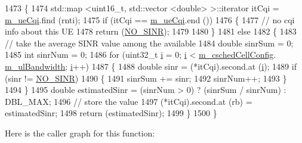 \begin{DoxyCode}
1473 \{
1474   std::map <uint16\_t, std::vector <double> >::iterator itCqi = \hyperlink{classns3_1_1PfFfMacScheduler_acf67c0074356c705e8bd89bb49ddd5ad}{m\_ueCqi}.find (rnti);
1475   \textcolor{keywordflow}{if} (itCqi == \hyperlink{classns3_1_1PfFfMacScheduler_acf67c0074356c705e8bd89bb49ddd5ad}{m\_ueCqi}.end ())
1476     \{
1477       \textcolor{comment}{// no cqi info about this UE}
1478       \textcolor{keywordflow}{return} (\hyperlink{cqa-ff-mac-scheduler_8h_a520d71777be043568160c783a9c65fd5}{NO\_SINR});
1479 
1480     \}
1481   \textcolor{keywordflow}{else}
1482     \{
1483       \textcolor{comment}{// take the average SINR value among the available}
1484       \textcolor{keywordtype}{double} sinrSum = 0;
1485       \textcolor{keywordtype}{int} sinrNum = 0;
1486       \textcolor{keywordflow}{for} (uint32\_t \hyperlink{bernuolliDistribution_8m_a6f6ccfcf58b31cb6412107d9d5281426}{i} = 0; \hyperlink{bernuolliDistribution_8m_a6f6ccfcf58b31cb6412107d9d5281426}{i} < \hyperlink{classns3_1_1PfFfMacScheduler_a0be1f7a1e78824b031e48208b8af1048}{m\_cschedCellConfig}.
      \hyperlink{structns3_1_1FfMacCschedSapProvider_1_1CschedCellConfigReqParameters_a5ab5b102878e6e7e7727a14af4a64d2f}{m\_ulBandwidth}; \hyperlink{bernuolliDistribution_8m_a6f6ccfcf58b31cb6412107d9d5281426}{i}++)
1487         \{
1488           \textcolor{keywordtype}{double} sinr = (*itCqi).second.at (\hyperlink{bernuolliDistribution_8m_a6f6ccfcf58b31cb6412107d9d5281426}{i});
1489           \textcolor{keywordflow}{if} (sinr != \hyperlink{cqa-ff-mac-scheduler_8h_a520d71777be043568160c783a9c65fd5}{NO\_SINR})
1490             \{
1491               sinrSum += sinr;
1492               sinrNum++;
1493             \}
1494         \}
1495       \textcolor{keywordtype}{double} estimatedSinr = (sinrNum > 0) ? (sinrSum / sinrNum) : DBL\_MAX;
1496       \textcolor{comment}{// store the value}
1497       (*itCqi).second.at (rb) = estimatedSinr;
1498       \textcolor{keywordflow}{return} (estimatedSinr);
1499     \}
1500 \}
\end{DoxyCode}


Here is the caller graph for this function\+:


